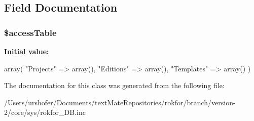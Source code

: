 \subsection{\-Field \-Documentation}
\hypertarget{classrokfor___d_b_a8c4ba7dc50a7c4755880e763de1fe029}{
\subsubsection[{\$access\-Table}]{\setlength{\rightskip}{0pt plus 5cm}\$access\-Table}}
\label{classrokfor___d_b_a8c4ba7dc50a7c4755880e763de1fe029}
{\bfseries \-Initial value\-:}
\begin{DoxyCode}
 array(
                "Projects" => array(),
                "Editions" => array(),                  
                "Templates" => array()
        )
\end{DoxyCode}


\-The documentation for this class was generated from the following file\-:\begin{DoxyCompactItemize}
\item 
/\-Users/urshofer/\-Documents/text\-Mate\-Repositories/rokfor/branch/version-\/2/core/sys/rokfor\-\_\-\-D\-B.\-inc\end{DoxyCompactItemize}
